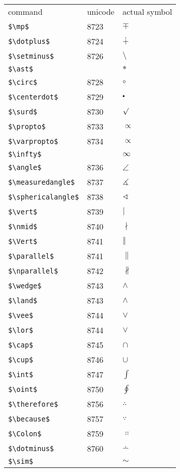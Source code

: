 \documentclass{article}
\begin{document}
\begin{table}
\begin{center}
\begin{tabular}{lll}
command & unicode & actual symbol\\
\verb#$\mp$# & 8723 & $\mp$\\ 
\verb#$\dotplus$# & 8724 & $\dotplus$\\ 
\verb#$\setminus$# & 8726 & $\setminus$\\ 
\verb#$\ast$# &  & $\ast$\\ 
\verb#$\circ$# & 8728 & $\circ$\\ 
\verb#$\centerdot$# & 8729 & $\centerdot$\\ 
\verb#$\surd$# & 8730 & $\surd$\\ 
\verb#$\propto$# & 8733 & $\propto$\\ 
\verb#$\varpropto$# & 8734 & $\varpropto$\\ 
\verb#$\infty$# &  & $\infty$\\ 
\verb#$\angle$# & 8736 & $\angle$\\ 
\verb#$\measuredangle$# & 8737 & $\measuredangle$\\ 
\verb#$\sphericalangle$# & 8738 & $\sphericalangle$\\ 
\verb#$\vert$# & 8739 & $\vert$\\ 
\verb#$\nmid$# & 8740 & $\nmid$\\ 
\verb#$\Vert$# & 8741 & $\Vert$\\ 
\verb#$\parallel$# & 8741 & $\parallel$\\ 
\verb#$\nparallel$# & 8742 & $\nparallel$\\ 
\verb#$\wedge$# & 8743 & $\wedge$\\ 
\verb#$\land$# & 8743 & $\land$\\ 
\verb#$\vee$# & 8744 & $\vee$\\ 
\verb#$\lor$# & 8744 & $\lor$\\ 
\verb#$\cap$# & 8745 & $\cap$\\ 
\verb#$\cup$# & 8746 & $\cup$\\ 
\verb#$\int$# & 8747 & $\int$\\ 
\verb#$\oint$# & 8750 & $\oint$\\ 
\verb#$\therefore$# & 8756 & $\therefore$\\ 
\verb#$\because$# & 8757 & $\because$\\ 
\verb#$\Colon$# & 8759 & $\Colon$\\ 
\verb#$\dotminus$# & 8760 & $\dotminus$\\ 
\verb#$\sim$# &  & $\sim$\\ 

\end{tabular}
\end{center}
\end{table}
\end{document}
